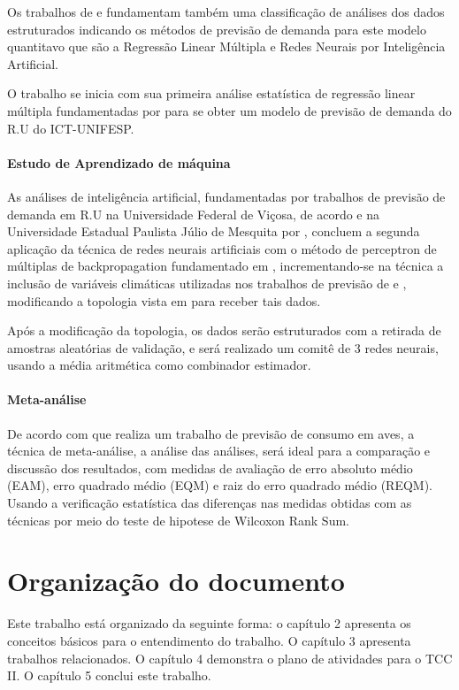 \documentclass[	12pt, Times, openright, twoside, a4paper, english, brazil]{abntex2}
\begin{document}
          Os trabalhos de \cite{Junior2007} e \cite{Silva2010} fundamentam também uma classificação de análises dos dados estruturados indicando os métodos de previsão de demanda para este modelo quantitavo que são a Regressão Linear Múltipla e Redes Neurais por Inteligência Artificial.

          O trabalho se inicia com sua primeira análise estatística de regressão linear múltipla fundamentadas por \cite{Clarice2011} para se obter um modelo de previsão de demanda do R.U do ICT-UNIFESP.

        \paragraph*{Estudo de Aprendizado de máquina}
          As análises de inteligência artificial, fundamentadas por trabalhos de previsão de demanda em R.U na Universidade Federal de Viçosa, de acordo \cite{Lopes2008} e na Universidade Estadual Paulista Júlio de Mesquita por \cite{Rocha2011}, concluem a segunda aplicação da técnica de redes neurais artificiais com o método de perceptron de múltiplas de backpropagation fundamentado em \cite{Haykin1994}, incrementando-se na técnica a inclusão de variáveis climáticas utilizadas nos trabalhos de previsão de  \cite{Almeida2013} \cite{RUAS2012} e \cite{Silva2010}, modificando a topologia vista em \cite{Lopes2008} para receber tais dados. 

          Após a modificação da topologia, os dados serão estruturados com a retirada de amostras aleatórias de validação, e será realizado um comitê de 3 redes neurais, usando a média aritmética como combinador estimador.

        \paragraph*{Meta-análise}
          De acordo com \cite{Flavia2014} que realiza um trabalho de previsão de consumo em aves, a técnica de meta-análise, a análise das análises, será ideal para a comparação e discussão dos resultados, com medidas de avaliação de erro absoluto médio (EAM), erro quadrado médio (EQM) e raiz do erro quadrado médio (REQM). Usando a verificação estatística das diferenças nas medidas obtidas com as técnicas por meio do teste de hipotese de Wilcoxon Rank Sum. 

      \section{Organização do documento}
        Este trabalho está organizado da seguinte forma: o capítulo 2 apresenta os conceitos básicos para o entendimento do trabalho. O capítulo 3 apresenta trabalhos relacionados. O capítulo 4 demonstra o plano de atividades para o TCC II. O capítulo 5 conclui este trabalho.
\end{document}
